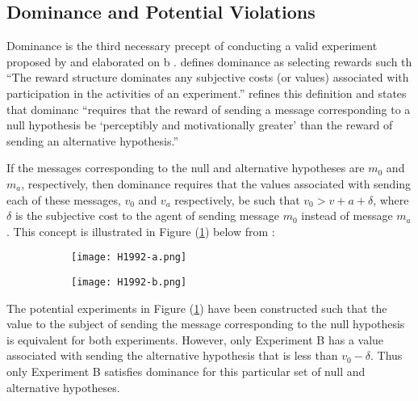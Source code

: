 \documentclass[11pt,a4paper]{report}
\begin{document}
\subsection{Dominance and Potential Violations}

Dominance is the third necessary precept of conducting a valid experiment proposed by \textcite{Smith1982} and elaborated on b \textcite{Harrison1989, Harrison1992}.
\textcite[934]{Smith1982} defines dominance as selecting rewards such th \enquote{The reward structure dominates any subjective costs (or values) associated with participation in the activities of an experiment.}
\textcite[1426]{Harrison1992} refines this definition and states that dominanc \enquote{requires that the reward of sending a message corresponding to a null hypothesis be \enquote{perceptibly and motivationally greater} than the reward of sending an alternative hypothesis.}

If the messages corresponding to the null and alternative hypotheses are $m_0$ and $m_a$, respectively, then dominance requires that the values associated with sending each of these messages, $v_0$ and $v_a$ respectively, be such that $v_0 > v+a + \delta$, where $\delta$ is the subjective cost to the agent of sending message $m_0$ instead of message $m_a$ \parencite[1427]{Harrison1992}.
This concept is illustrated in Figure (\ref{fig:H1992:Dom-a}) below from \textcite[1427]{Harrison1992}:

\begin{figure}[h!]
	\centering
	\caption{ \textcite{Harrison1992} }
	\label{fig:H1992:Dom}
	\begin{subfigure}{.5\textwidth}
		\centering
		\texttt{[image: H1992-a.png]}
		\caption{}
		\label{fig:H1992:Dom-a}
	\end{subfigure}%
	\begin{subfigure}{.5\textwidth}
		\centering
		\texttt{[image: H1992-b.png]}
		\caption{}
		\label{fig:H1992:Dom-b}
	\end{subfigure}
\end{figure}


The potential experiments in Figure (\ref{fig:H1992:Dom-a}) have been constructed such that the value to the subject of sending the message corresponding to the null hypothesis is equivalent for both experiments.
However, only Experiment B has a value associated with sending the alternative hypothesis that is less than $v_0 - \delta$.
Thus only Experiment B satisfies dominance for this particular set of null and alternative hypotheses.
\end{document}
